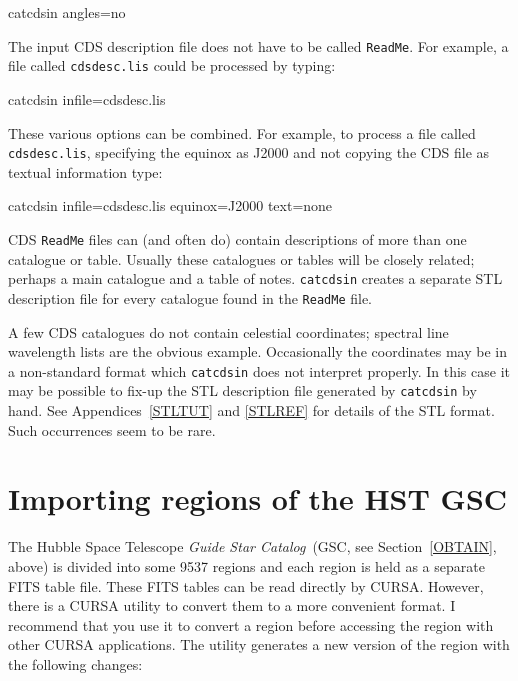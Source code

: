\documentclass[twoside,11pt]{starlink}
\begin{document}
\begin{terminalv}
catcdsin  angles=no
\end{terminalv}

The input CDS description file does not have to be called \texttt{ReadMe}.
For example, a file called \texttt{cdsdesc.lis} could be processed by
typing:

\begin{terminalv}
catcdsin infile=cdsdesc.lis
\end{terminalv}

These various options can be combined.  For example, to process a
file called \texttt{cdsdesc.lis}, specifying the equinox as J2000 and
not copying the CDS file as textual information type:

\begin{terminalv}
catcdsin  infile=cdsdesc.lis  equinox=J2000  text=none
\end{terminalv}

CDS \texttt{ReadMe} files can (and often do) contain descriptions of more
than one catalogue or table.  Usually these catalogues or tables will
be closely related; perhaps a main catalogue and a table of notes.
\texttt{catcdsin} creates a separate STL description file for every
catalogue found in the \texttt{ReadMe} file.

A few CDS catalogues do not contain celestial coordinates; spectral
line wavelength lists are the obvious example.  Occasionally the
coordinates may be in a non-standard format which \texttt{catcdsin} does
not interpret properly.  In this case it may be possible to fix-up the
STL description file generated by \texttt{catcdsin} by hand.  See
Appendices~\ref{STLTUT} and \ref{STLREF} for details of the STL format.
Such occurrences seem to be rare.


\section{\label{GSCIN}Importing regions of the HST GSC}

The Hubble Space Telescope \textit{Guide Star Catalog}\, (GSC, see
Section~\ref{OBTAIN}, above) is divided into some 9537 regions and
each region is held as a separate FITS table file. These FITS tables can
be read directly by CURSA. However, there is a CURSA utility to convert
them to a more convenient format. I recommend that you use it to
convert a region before accessing the region with other CURSA applications.
The utility generates a new version of the region with the following
changes:
\end{document}
